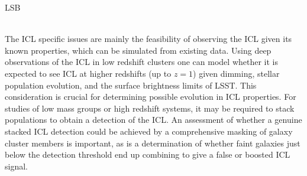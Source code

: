 {\begin{tasklist}{LSB}
\begin{task}
{~\\
The ICL specific issues are mainly the feasibility of observing the ICL given its known properties, which can be simulated from existing data. Using deep observations of the ICL in low redshift clusters one can model whether it is expected to see ICL at higher redshifts (up to $z=1$) given dimming, stellar population evolution, and the surface brightness limits of LSST. This consideration is crucial for determining possible evolution in ICL properties. For
studies of low mass groups or high redshift systems, it may be required to stack populations to obtain a detection of the ICL.
An assessment of whether a genuine stacked ICL detection could be achieved by a comprehensive masking of galaxy cluster members is important, as is a determination of whether faint galaxies just below the detection threshold end up combining to give a false or boosted ICL signal.
}
~\\
\end{task}
\end{tasklist}
}
